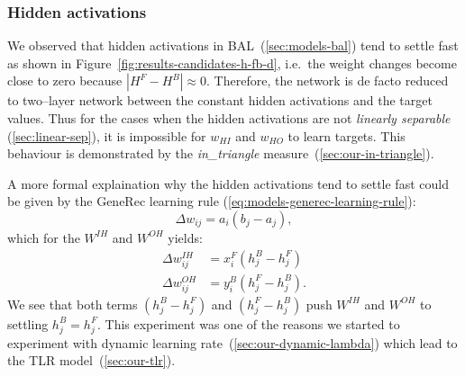 
\subsubsection{Hidden activations}
\label{sec:our-hidden-activation} 

We observed that hidden activations in BAL~(\ref{sec:models-bal}) tend to settle fast as shown in Figure~\ref{fig:results-candidates-h-fb-d}, i.e.~the weight changes become close to zero because $|H^F - H^B| \approx 0$. Therefore, the network is de facto reduced to two--layer network between the constant hidden activations and the target values. Thus for the cases when the hidden activations are not \emph{linearly separable} (\ref{sec:linear-sep}), it is impossible for $w_{HI}$ and $w_{HO}$ to learn targets. This behaviour is demonstrated by the \emph{in\_triangle} measure~(\ref{sec:our-in-triangle}). 

A more formal explaination why the hidden activations tend to settle fast could be given by the GeneRec learning rule (\ref{eq:models-generec-learning-rule}): 
\begin{equation} 
  \Delta w_{ij} = a_i(b_j - a_j),
\end{equation} \nonumber 
which for the $W^{IH}$ and $W^{OH}$ yields: 
\begin{align} 
  \Delta w_{ij}^{IH} &= x^F_i(h^B_j - h^F_j) \nonumber \\ 
  \Delta w_{ij}^{OH} &= y^B_i(h^F_j - h^B_j). \nonumber  
\end{align} 
We see that both terms $(h^B_j - h^F_j)$ and $(h^F_j - h^B_j)$ push $W^{IH}$ and $W^{OH}$ to settling $h^B_j = h^F_j$. This experiment was one of the reasons we started to experiment with dynamic learning rate~(\ref{sec:our-dynamic-lambda}) which lead to the TLR model~(\ref{sec:our-tlr}). 

